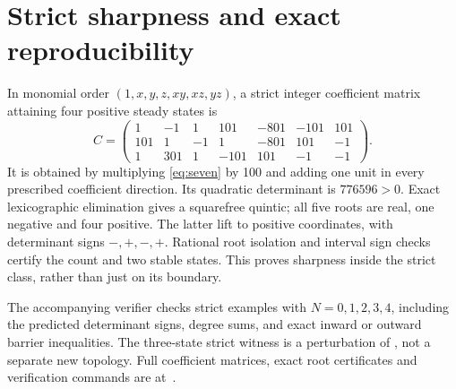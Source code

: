 \documentclass[11pt]{article}
\theoremstyle{remark}\newtheorem{remark}[theorem]{Remark}
\begin{document}
\section{Strict sharpness and exact reproducibility}
In monomial order $(1,x,y,z,xy,xz,yz)$, a strict integer coefficient matrix
attaining four positive steady states is
\begin{equation}\label{eq:strictfour}
 C=\begin{pmatrix}
 1&-1&1&101&-801&-101&101\\
 101&1&-1&1&-801&101&-1\\
 1&301&1&-101&101&-1&-1
 \end{pmatrix}.
\end{equation}
It is obtained by multiplying \eqref{eq:seven} by 100 and adding one unit in
every prescribed coefficient direction. Its quadratic determinant is $776596>0$.
Exact lexicographic elimination gives a squarefree quintic; all five roots are
real, one negative and four positive. The latter lift to positive coordinates,
with determinant signs $-,+,-,+$. Rational root isolation and interval sign
checks certify the count and two stable states. This proves sharpness inside
the strict class, rather than just on its boundary.

The accompanying verifier checks strict examples with $N=0,1,2,3,4$,
including the predicted determinant signs, degree sums, and exact inward or
outward barrier inequalities. The three-state strict witness is a perturbation
of \cite[Example 3]{TZ}, not a separate new topology. Full coefficient matrices,
exact root certificates and verification commands are at~\cite{repo}.
\end{document}
